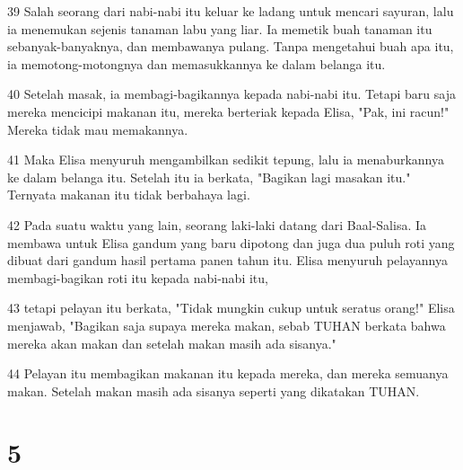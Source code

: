 \par 39 Salah seorang dari nabi-nabi itu keluar ke ladang untuk mencari sayuran, lalu ia menemukan sejenis tanaman labu yang liar. Ia memetik buah tanaman itu sebanyak-banyaknya, dan membawanya pulang. Tanpa mengetahui buah apa itu, ia memotong-motongnya dan memasukkannya ke dalam belanga itu.
\par 40 Setelah masak, ia membagi-bagikannya kepada nabi-nabi itu. Tetapi baru saja mereka mencicipi makanan itu, mereka berteriak kepada Elisa, "Pak, ini racun!" Mereka tidak mau memakannya.
\par 41 Maka Elisa menyuruh mengambilkan sedikit tepung, lalu ia menaburkannya ke dalam belanga itu. Setelah itu ia berkata, "Bagikan lagi masakan itu." Ternyata makanan itu tidak berbahaya lagi.
\par 42 Pada suatu waktu yang lain, seorang laki-laki datang dari Baal-Salisa. Ia membawa untuk Elisa gandum yang baru dipotong dan juga dua puluh roti yang dibuat dari gandum hasil pertama panen tahun itu. Elisa menyuruh pelayannya membagi-bagikan roti itu kepada nabi-nabi itu,
\par 43 tetapi pelayan itu berkata, "Tidak mungkin cukup untuk seratus orang!" Elisa menjawab, "Bagikan saja supaya mereka makan, sebab TUHAN berkata bahwa mereka akan makan dan setelah makan masih ada sisanya."
\par 44 Pelayan itu membagikan makanan itu kepada mereka, dan mereka semuanya makan. Setelah makan masih ada sisanya seperti yang dikatakan TUHAN.

\chapter{5}

